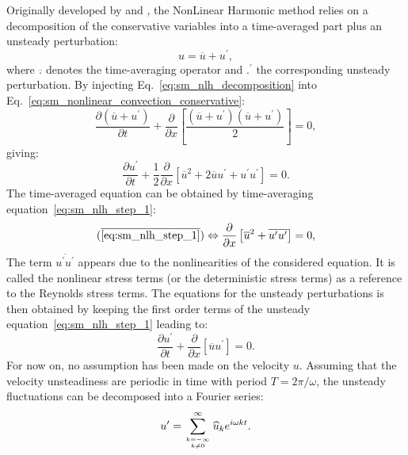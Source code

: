 Originally developed by \citet{He1998} and \citet{Ning1998}, the 
NonLinear Harmonic method
relies on a decomposition of the conservative variables into a
time-averaged part plus an unsteady perturbation:
\begin{equation}
	u = \overline{u} + u^\prime,
	\label{eq:sm_nlh_decomposition}
\end{equation}
where $\overline{.}$ denotes the time-averaging operator and
$.^\prime$ the corresponding unsteady perturbation.
By injecting Eq.~\ref{eq:sm_nlh_decomposition} into
Eq.~\ref{eq:sm_nonlinear_convection_conservative}:
\begin{equation}
	\frac{\partial \left( \overline{u} + u^\prime \right)}{\partial t} + 
	\frac{\partial}{\partial x} \left[\frac{
		\left( \overline{u} + u^\prime\right)
		\left( \overline{u} + u^\prime\right)}{2}\right] = 
	0,
\end{equation}
giving:
\begin{equation}
	\frac{\partial u^\prime}{\partial t} + 
	\frac{1}{2}\frac{\partial}{\partial x} \left[
	\overline{u}^2 + 2 \overline{u} u^\prime + u^\prime u^\prime \right] = 
	0.
	\label{eq:sm_nlh_step_1}
\end{equation}
The time-averaged equation can be obtained by time-averaging
equation~\ref{eq:sm_nlh_step_1}:
\begin{equation}
	(\overline{\ref{eq:sm_nlh_step_1}})
	\Leftrightarrow
	\frac{\partial}{\partial x}
	\left[\overline{u}^2 + 
	\overline{u^\prime u^\prime}\right] =
	0,
	\label{eq:sm_nlh_step_2}
\end{equation}
The term $\overline{u^\prime u^\prime}$
appears due to the nonlinearities of the considered equation. It
is called the nonlinear stress terms 
(or the deterministic stress terms) as a reference to 
the Reynolds stress terms. 
The equations for the unsteady perturbations is then obtained by keeping
the first order terms of the unsteady equation~\ref{eq:sm_nlh_step_1}
leading to:
\begin{equation}
	\frac{\partial u^\prime}{\partial t} + 
	\frac{\partial}{\partial x} \left[\overline{u} u^\prime \right] = 
	0.
\end{equation}
For now on, no assumption has been made on the velocity $u$.
Assuming that the velocity unsteadiness 
are periodic in time with period
$T=2 \pi / \omega$,
the unsteady fluctuations can be decomposed into 
a Fourier series:
\begin{equation}
	u^\prime = \sum_{k=-\infty \atop k \neq 0}^{\infty} 
	\widehat{u}_k e^{i \omega k t}.
	\label{eq:sm_nlh_decomposition_pert}
\end{equation}
